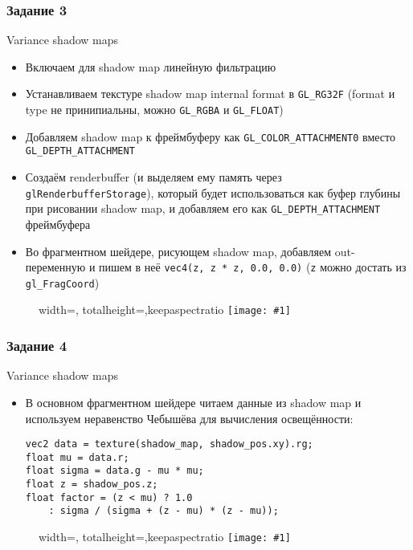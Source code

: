 \documentclass{beamer}
\newcommand{\slideimage}[1]{
  \begin{figure}
    \begin{adjustbox}{width=\textwidth, totalheight=\textheight-2\baselineskip-2\baselineskip,keepaspectratio}
      \texttt{[image: \#1]}
    \end{adjustbox}
  \end{figure}
}
\begin{document}
\begin{frame}[fragile]
\frametitle{Задание 3}
\fontsize{10pt}{10pt}
Variance shadow maps
\begin{itemize}
\item Включаем для shadow map линейную фильтрацию
\item Устанавливаем текстуре shadow map internal format в \verb|GL_RG32F| (format и type не принипиальны, можно \verb|GL_RGBA| и \verb|GL_FLOAT|)
\item Добавляем shadow map к фреймбуферу как \verb|GL_COLOR_ATTACHMENT0| вместо \verb|GL_DEPTH_ATTACHMENT|
\item Создаём renderbuffer (и выделяем ему память через \verb|glRenderbufferStorage|), который будет использоваться как буфер глубины при рисовании shadow map, и добавляем его как \verb|GL_DEPTH_ATTACHMENT| фреймбуфера
\item Во фрагментном шейдере, рисующем shadow map, добавляем out-переменную и пишем в неё \verb|vec4(z, z * z, 0.0, 0.0)| (\verb|z| можно достать из \verb|gl_FragCoord|)
\end{itemize}
\end{frame}

\begin{frame}[fragile]
\slideimage{3.png}
\end{frame}

\begin{frame}[fragile]
\frametitle{Задание 4}
\fontsize{10pt}{10pt}
Variance shadow maps
\begin{itemize}
\item В основном фрагментном шейдере читаем данные из shadow map и используем неравенство Чебышёва для вычисления освещённости:
\begin{verbatim}
vec2 data = texture(shadow_map, shadow_pos.xy).rg;
float mu = data.r;
float sigma = data.g - mu * mu;
float z = shadow_pos.z;
float factor = (z < mu) ? 1.0
    : sigma / (sigma + (z - mu) * (z - mu));
\end{verbatim}
\end{itemize}
\end{frame}

\begin{frame}[fragile]
\slideimage{4.png}
\end{frame}
\end{document}
